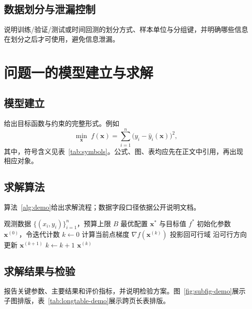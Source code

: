 \documentclass{huawei-cup}
\begin{document}
\subsection{数据划分与泄漏控制}
说明训练/验证/测试或时间回测的划分方式、样本单位与分组键，并明确哪些信息在划分之后才可使用，避免信息泄漏\cite{ref-book}。

\section{问题一的模型建立与求解}
\subsection{模型建立}
给出目标函数与约束的完整形式。例如
\begin{equation}
  \min_{\boldsymbol{x}}\; f(\boldsymbol{x})
  = \sum_{i=1}^{n}\bigl(y_i-\hat y_i(\boldsymbol{x})\bigr)^2,
  \label{eq:objective}
\end{equation}
其中，符号含义见表~\ref{tab:symbols}。公式、图、表均应先在正文中引用，再出现相应对象。

\subsection{求解算法}
算法~\ref{alg:demo}给出求解流程；数据字段口径依据公开说明文档\cite{ref-web}。

\begin{algorithm}[H]
  \caption{分层求解流程（示例）}
  \label{alg:demo}
  \begin{algorithmic}[1]
    \REQUIRE 观测数据 $\{(x_i,y_i)\}_{i=1}^{n}$，预算上限 $B$
    \ENSURE 最优配置 $\boldsymbol{x}^{*}$ 与目标值 $f^{*}$
    \STATE 初始化参数 $\boldsymbol{x}^{(0)}$，令迭代计数 $k \leftarrow 0$
      \STATE 计算当前点梯度 $\nabla f(\boldsymbol{x}^{(k)})$
        \STATE 投影回可行域
      \ELSE
        \STATE 沿可行方向更新 $\boldsymbol{x}^{(k+1)}$
      \ENDIF
      \STATE $k \leftarrow k+1$
    \ENDWHILE
    \RETURN $\boldsymbol{x}^{(k)}$
  \end{algorithmic}
\end{algorithm}

\subsection{求解结果与检验}
报告关键参数、主要结果和评价指标，并说明检验方案。图~\ref{fig:subfig-demo}展示子图排版，表~\ref{tab:longtable-demo}展示跨页长表排版。
\end{document}
